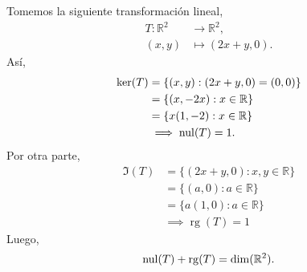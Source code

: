 \documentclass[12pt,a4paper]{book}
\newcommand{\rg}{\operatorname{rg}}
\newcommand{\llaves}[1]{\{#1\}}
\begin{document}
    \begin{ejemplo}
    \label{ej:26}
        Tomemos la siguiente transformación lineal,
        \begin{align*}
            T : \mathbb{R}^{2} & \to \mathbb{R}^{2},\\
            (x,y) & \mapsto (2x + y, 0).
        \end{align*}
        Así,
        \begin{align*}
            \ker(T) & = \llaves{(x,y):(2x + y, 0) = (0, 0)}\\
            & = \llaves{(x, -2x):x \in \mathbb{R}}\\
            & = \llaves{x(1,-2):x \in \mathbb{R}}\\
            & \implies \nul(T) = 1.
        \end{align*}
        Por otra parte, 
        \begin{align*}
            \Im(T) & = \llaves{(2x + y, 0): x, y \in \mathbb{R}}\\
            & = \llaves{(a, 0): a \in \mathbb{R}}\\
            & = \llaves{a(1,0): a \in \mathbb{R}}\\
            & \implies \rg(T) = 1
        \end{align*}
        Luego,
        \begin{equation*}
            \nul(T) + \rg(T) = \dim(\mathbb{R}^{2}).
        \end{equation*}
    \end{ejemplo}
\end{document}
